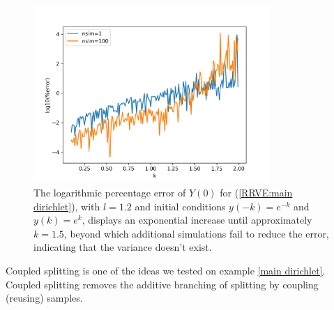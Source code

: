 \documentclass[a4paper,12pt]{article}
\begin{document}
\begin{figure}[h!]
    \centering
    \includegraphics[width=0.8\textwidth]{plots/mainD explosion.png}
    \caption{The logarithmic percentage error of $Y(0)$ for
    (\ref{RRVE:main dirichlet}), with $l=1.2$ and initial conditions
    $y(-k)=e^{-k}$ and $y(k)=e^{k}$, displays an exponential
    increase until approximately $k=1.5$, beyond which additional
    simulations fail to reduce the error, indicating that the variance
    doesn't exist.}
    \label{fig:mainD explosion}
\end{figure}

Coupled splitting is one of the ideas we tested on example \ref{main dirichlet}.
Coupled splitting removes the additive branching of splitting by coupling (reusing)
samples.
\end{document}
